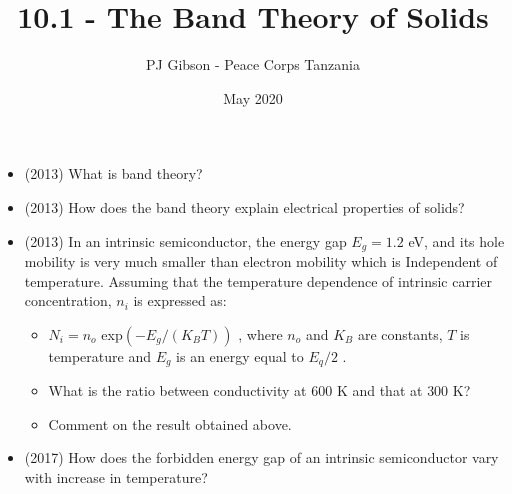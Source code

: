 \documentclass{article}
\title{\textbf{10.1 - The Band Theory of Solids}}
\author{PJ Gibson - Peace Corps Tanzania}
\date{May 2020}
\begin{document}
\maketitle

\begin{itemize}
\item (2013)  What is band theory?
\item (2013)  How does the band theory explain electrical properties of solids?
\item (2013)  In an intrinsic semiconductor, the energy gap $ E_{g}=1.2$ eV, and its hole mobility is very much smaller than electron mobility which is Independent of temperature. Assuming that the temperature dependence of intrinsic carrier concentration, $ n_{i}$ is expressed as:
 \begin{itemize}
\item $ N_{i}=n_{o}$ exp$ (-E_{g}/(K_{B}T))$ , where $ n_{o}$ and $ K_{B}$ are constants, $ T$ is temperature and $ E_{g}$ is an energy equal to $ E_{q}/2$ .  
\item What is the ratio between conductivity at $ 600$ K and that at $ 300$ K?
\item Comment on the result obtained above.
\end{itemize}
\item (2017)  How does the forbidden energy gap of an intrinsic semiconductor vary with increase in temperature? 
\end{itemize}
\end{document}
